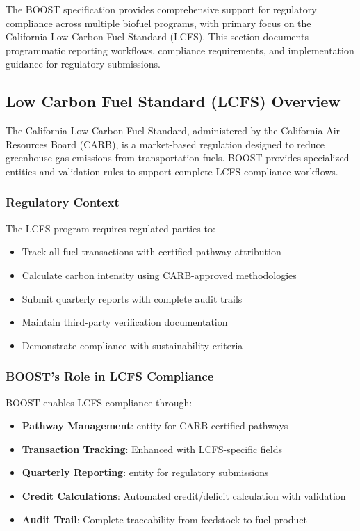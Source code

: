 

The BOOST specification provides comprehensive support for regulatory compliance across multiple biofuel programs, with primary focus on the California Low Carbon Fuel Standard (LCFS). This section documents programmatic reporting workflows, compliance requirements, and implementation guidance for regulatory submissions.

\subsection{Low Carbon Fuel Standard (LCFS) Overview}
\label{sec:lcfs-overview}

The California Low Carbon Fuel Standard, administered by the California Air Resources Board (CARB), is a market-based regulation designed to reduce greenhouse gas emissions from transportation fuels. BOOST provides specialized entities and validation rules to support complete LCFS compliance workflows.

\subsubsection{Regulatory Context}

The LCFS program requires regulated parties to:
\begin{itemize}
    \item Track all fuel transactions with certified pathway attribution
    \item Calculate carbon intensity using CARB-approved methodologies
    \item Submit quarterly reports with complete audit trails
    \item Maintain third-party verification documentation
    \item Demonstrate compliance with sustainability criteria
\end{itemize}

\subsubsection{BOOST's Role in LCFS Compliance}

BOOST enables LCFS compliance through:
\begin{itemize}
    \item \textbf{Pathway Management}:  entity for CARB-certified pathways
    \item \textbf{Transaction Tracking}: Enhanced  with LCFS-specific fields
    \item \textbf{Quarterly Reporting}:  entity for regulatory submissions
    \item \textbf{Credit Calculations}: Automated credit/deficit calculation with validation
    \item \textbf{Audit Trail}: Complete traceability from feedstock to fuel product
\end{itemize}


